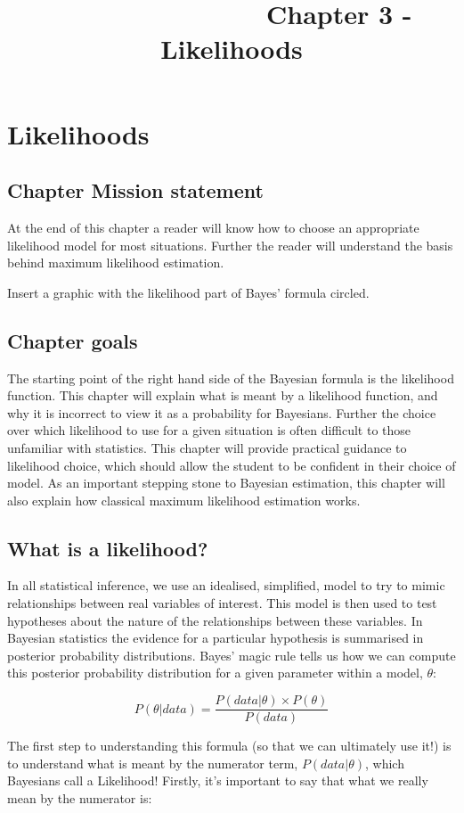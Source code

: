 \documentclass[11pt,fullpage]{book}
\title{\textbf{~~~~~~~~~~~~~~~}\newline Chapter 3 - Likelihoods}
\author{}
\begin{document}
\chapter{Likelihoods}
\section{Chapter Mission statement}
At the end of this chapter a reader will know how to choose an appropriate likelihood model for most situations. Further the reader will understand the basis behind maximum likelihood estimation.

Insert a graphic with the likelihood part of Bayes' formula circled.

\section{Chapter goals}
The starting point of the right hand side of the Bayesian formula is the likelihood function. This chapter will explain what is meant by a likelihood function, and why it is incorrect to view it as a probability for Bayesians. Further the choice over which likelihood to use for a given situation is often difficult to those unfamiliar with statistics. This chapter will provide practical guidance to likelihood choice, which should allow the student to be confident in their choice of model. As an important stepping stone to Bayesian estimation, this chapter will also explain how classical maximum likelihood estimation works. 

\section{What is a likelihood?}
In all statistical inference, we use an idealised, simplified, model to try to mimic relationships between real variables of interest. This model is then used to test hypotheses about the nature of the relationships between these variables. In Bayesian statistics the evidence for a particular hypothesis is summarised in posterior probability distributions. Bayes' magic rule tells us how we can compute this posterior probability distribution for a given parameter within a model, $\theta$:

\begin{equation}
P(\theta|data) = \frac{P(data|\theta)\times P(\theta)}{P(data)}
\end{equation}\label{eq:Likelihood_Bayes}

The first step to understanding this formula (so that we can ultimately use it!) is to understand what is meant by the numerator term, $P(data|\theta)$, which Bayesians call a Likelihood! Firstly, it's important to say that what we really mean by the numerator is:
\end{document}
